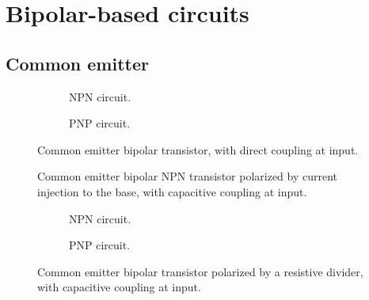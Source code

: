 
\chapter{Bipolar-based circuits}
	
	

\section{Common emitter}


	\begin{figure}[htb]
		\centering
		\begin{subfigure}[b]{0.49\textwidth}
			\centering
			
			\caption{NPN circuit.%
				\label{fig__bip_npn_common_emitter_direct_coupling}}
		\end{subfigure}
		\hfill
		\begin{subfigure}[b]{0.49\textwidth}
			\centering
			
			\caption{PNP circuit.%
				\label{fig__bip_pnp_common_emitter_direct_coupling}}
		\end{subfigure}
		\caption{Common emitter bipolar transistor, with direct coupling at input.%
			\label{fig__bip_common_emitter_direct_coupling}}
	\end{figure}


	\begin{figure}[htb]
		\centering
		
		\caption{Common emitter bipolar NPN transistor polarized by current injection to the base, with capacitive coupling at input.%
			\label{fig__bip_npn_common_emitter_I_injection_C_coupling}}
	\end{figure}

	\begin{figure}[htb]
		\centering
		\begin{subfigure}[b]{0.49\textwidth}
			\centering
			
			\caption{NPN circuit.%
				\label{fig__bip_npn_common_emitter_Rdiv_pol_C_coupling}}
		\end{subfigure}
		\hfill
		\begin{subfigure}[b]{0.49\textwidth}
			\centering
			
			\caption{PNP circuit.%
				\label{fig__bip_pnp_common_emitter_Rdiv_pol_C_coupling}}
		\end{subfigure}
		\caption{Common emitter bipolar transistor polarized by a resistive divider, with capacitive coupling at input.%
			\label{fig__bip_common_emitter_Rdiv_pol_C_coupling}}
	\end{figure}



